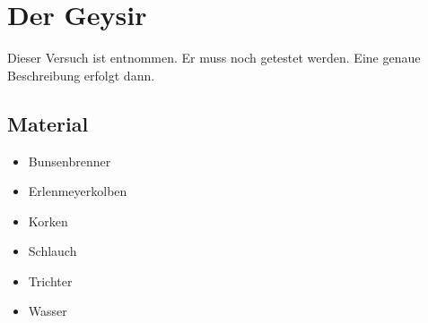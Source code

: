\section{Der Geysir}

Dieser Versuch ist \cite{Physikanten} entnommen.
Er muss noch getestet werden.
Eine genaue Beschreibung erfolgt dann.

\subsection{Material}

\begin{itemize}
	\item Bunsenbrenner
	\item Erlenmeyerkolben
	\item Korken
	\item Schlauch
	\item Trichter
	\item Wasser
\end{itemize}
